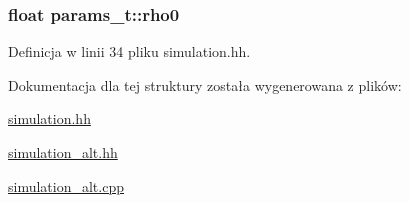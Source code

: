 \subsubsection[{rho0}]{\setlength{\rightskip}{0pt plus 5cm}float params\+\_\+t\+::rho0}\label{structparams__t_a2eb309edb681d0a998f23fc692a73781}


Definicja w linii 34 pliku simulation.\+hh.



Dokumentacja dla tej struktury została wygenerowana z plików\+:\begin{DoxyCompactItemize}
\item 
\hyperlink{simulation_8hh}{simulation.\+hh}\item 
\hyperlink{simulation__alt_8hh}{simulation\+\_\+alt.\+hh}\item 
\hyperlink{simulation__alt_8cpp}{simulation\+\_\+alt.\+cpp}\end{DoxyCompactItemize}
